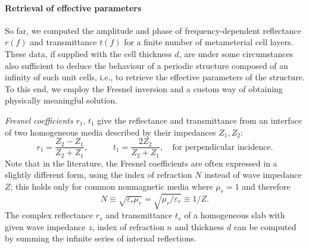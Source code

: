 \paragraph{Retrieval of effective parameters} %
So far, we computed the amplitude and phase of frequency-dependent reflectance $r(f)$ and transmittance $t(f)$ for a finite number of metameterial cell layers. 
These data, if supplied with the cell thickness $d$, are under some circumstances also sufficient to deduce the behaviour of a periodic structure composed of an infinity of such unit cells, i.e., to retrieve the effective parameters of the structure. 
To this end, we employ the Fresnel inversion and a custom way of obtaining physically meaningful  solution.

\textit{Fresnel coefficients} $r_1$, $t_1$ give the reflectance and transmittance from an interface of two homogeneous media described by their impedances $Z_1, Z_2$:
\begin{equation} r_1 = \frac{Z_2 - Z_1}{Z_2 + Z_1}, \quad \quad \quad t_1 = \frac{2 Z_2}{Z_2 + Z_1}, \quad \text{for perpendicular incidence}. \label{eq_fresnel}\end{equation}
Note that in the literature, the Fresnel coefficients are often expressed in a slightly different form, using the index of refraction $N$ instead of wave impedance $Z$; this holds only for common nonmagnetic media where $\mu_r = 1$ and therefore 
$$N \equiv \sqrt{\varepsilon_r \mu_r} = \sqrt{\mu_r/\varepsilon_r } \equiv 1/Z.$$ 
The complex reflectance $r_{s}$ and transmittance $t_{s}$ of a homogeneous slab with given wave impedance $z$, index of refraction $n$ and thickness $d$ can be computed by summing the infinite series of internal reflections.

